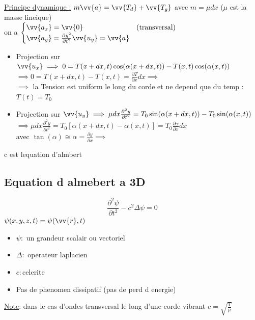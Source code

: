 \documentclass[12pt]{book}
\begin{document}
            \underline{Principe dynamique :} $m\vv{a} = \vv{T_d}+\vv{T_g}$ avec $m=\mu dx$ ($\mu$ est la masse lineique) \\ 
            on a $\begin{cases}
                \vv{a_x} = \vv{0} & (\text{transversal}) \\
                \vv{a_y} = \frac{\partial y^2}{\partial t^2}\vv{u_y}=\vv{a}
            \end{cases}$ \\
            \begin{itemize}
                \item Projection sur $\vv{u_x} \implies 0 =T(x+dx,t)\cos(\alpha(x+dx,t)) - T(x,t)\cos(\alpha(x,t))$ \\
                    $\implies 0 = T(x+dx,t)-T(x,t) = \frac{\partial T}{\partial x}dx \implies$ \\
                    $\implies$ la Tension est uniform le long du corde et ne depend que du temp :$T(t)=T_0$
                \item Projection sur $\vv{u_y} \implies \mu dx \frac{\partial^2y}{\partial t^2} = T_0\sin(\alpha(x+dx,t))-T_0\sin(\alpha(x,t))$\\
                    $\implies \mu dx \frac{\partial^2y}{\partial t^2} = T_0[\alpha(x+dx,t)-\alpha(x,t)] = T_0\frac{\partial \alpha}{\partial x}dx$ \\
                    avec $\tan(\alpha) \cong \alpha = \frac{\partial y}{\partial x} \implies $ 
            \end{itemize}
            \begin{center}
                 c est lequation d'almbert
            \end{center}
            \subsection{Equation d almebert a 3D}
                $$ \frac{\partial^2 \psi }{\partial t^2} - c^2\Delta\psi =0 $$
                $\psi (x,y,z,t) = \psi(\vv{r},t)$
                \begin{itemize}
                    \item $\psi :$ un grandeur scalair ou vectoriel 
                    \item $ \Delta : $ operateur laplacien
                    \item $ c :$celerite 
                    \item Pas de phenomen dissipatif (pas de perd d energie)
                \end{itemize}
                \underline{Note}: dans le cas d'ondes transversal le long d'une corde vibrant $c = \sqrt{\frac{T}{\mu}}$
\end{document}
